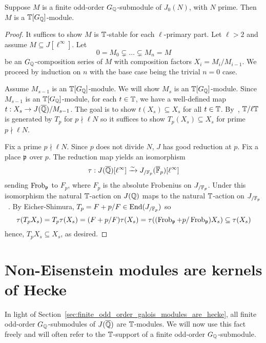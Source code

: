\documentclass[thesis.tex]{subfiles}
\begin{document}
\begin{proposition}\label{prop:G_modules_are_hecke}
    Suppose $M$ is a finite odd-order $G_{\mathbb{Q}}$-submodule of $J_0(N)$, with $N$
    prime. Then $M$ is a $\mathbb{T}[G_{\mathbb{Q}}]$-module.
\end{proposition}
\begin{proof}
    It suffices to show $M$ is $\mathbb{T}$-stable for each $\ell$-primary part. Let
    $\ell>2$ and assume $M\subseteq J[\ell^\infty]$. Let
    \[
        0 = M_0 \subsetneq \ldots \subsetneq M_n = M
    \]
    be an $G_{\mathbb{Q}}$-composition series of $M$ with composition factors $X_i =
    M_i/M_{i-1}$. We proceed by induction on $n$ with the base
    case being the trivial $n=0$ case.

    Assume $M_{s-1}$ is an $\mathbb{T}[G_{\mathbb{Q}}]$-module. We will show $M_s$ is an
    $\mathbb{T}[G_{\mathbb{Q}}]$-module. Since $M_{s-1}$ is an $\mathbb{T}[G_{\mathbb{Q}}]$-module, for each
    $t\in \mathbb{T}$, we have a well-defined map $t:X_s\to J(\overline{\mathbb{Q}})/M_{s-1}$. The
    goal is to show $t(X_s)\subseteq X_s$ for all $t\in \mathbb{T}$.
    By~\cite[Proposition 2]{ribet:mult_p_finite}, $\mathbb{T}/\ell \mathbb{T}$ is generated
    by $T_p$ for $p\nmid \ell N$ so it suffices to show $T_p(X_s)\subseteq X_s$
    for prime $p\nmid \ell N$.

    Fix a prime $p\nmid \ell N$. Since $p$ does not divide $N$, $J$ has good
    reduction at $p$. Fix a place $\mathfrak{p}$ over $p$. The reduction map yields an
    isomorphism~\cite[Theorem 1, Lemma 2]{serre-tate}
    \[
        \tau:J(\overline{\mathbb{Q}})[\ell^\infty] \xrightarrow{\sim} J_{/\mathbb{F}_p} (\overline{\mathbb{F}}_p)[\ell^\infty]
    \]
    sending $\operatorname{Frob}_{\mathfrak{p}}$ to $F_p$, where $F_p$ is the absolute Frobenius on
    $J_{/\mathbb{F}_p}$. Under this isomorphism the natural $\mathbb{T}$-action on $J(\mathbb{Q})$
    maps to the natural $\mathbb{T}$-action on $J_{/\mathbb{F}_p}$~\cite[\S
    5.2]{ribet-stein:serre}. By Eicher-Shimura, $T_p = F+p/F\in
    \operatorname{End}(J_{/\mathbb{F}_p})$ so
    \[
        \tau(T_p X_s)
        = T_p\tau(X_s)
        = (F+p/F)\tau(X_s)
        = \tau((\operatorname{Frob}_{\mathfrak{p}}+p/\operatorname{Frob}_{\mathfrak{p}})X_s)
        \subseteq \tau(X_s)
    \]
    hence, $T_p X_s\subseteq X_s$, as desired.
\end{proof}


\section{Non-Eisenstein modules are kernels of Hecke}%
\label{sec:non_eisenstein_modules_are_kernels_of_hecke}

In light of Section~\ref{sec:finite_odd_order_galois_modules_are_hecke}, all
finite odd-order $G_{\mathbb{Q}}$-submodules of $J(\overline{\mathbb{Q}})$ are $\mathbb{T}$-modules. We will
now use this fact freely and will often refer to the $\mathbb{T}$-support of a finite
odd-order $G_{\mathbb{Q}}$-submodule.
\end{document}
